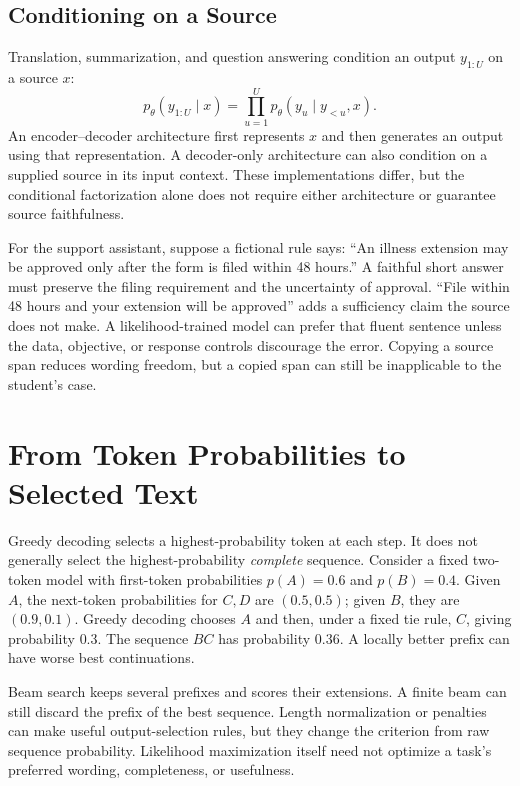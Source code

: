 \subsection{Conditioning on a Source}

Translation, summarization, and question answering condition an output $y_{1:U}$ on a source $x$:
\[
 p_\theta(y_{1:U}\mid x)=\prod_{u=1}^{U}
 p_\theta(y_u\mid y_{<u},x).
\]
An encoder--decoder architecture first represents $x$ and then generates an output using that representation. A decoder-only architecture can also condition on a supplied source in its input context. These implementations differ, but the conditional factorization alone does not require either architecture or guarantee source faithfulness.

For the support assistant, suppose a fictional rule says: ``An illness extension may be approved only after the form is filed within 48 hours.'' A faithful short answer must preserve the filing requirement and the uncertainty of approval. ``File within 48 hours and your extension will be approved'' adds a sufficiency claim the source does not make. A likelihood-trained model can prefer that fluent sentence unless the data, objective, or response controls discourage the error. Copying a source span reduces wording freedom, but a copied span can still be inapplicable to the student's case.

\section{From Token Probabilities to Selected Text}

Greedy decoding selects a highest-probability token at each step. It does not generally select the highest-probability \emph{complete} sequence. Consider a fixed two-token model with first-token probabilities $p(A)=0.6$ and $p(B)=0.4$. Given $A$, the next-token probabilities for $C,D$ are $(0.5,0.5)$; given $B$, they are $(0.9,0.1)$. Greedy decoding chooses $A$ and then, under a fixed tie rule, $C$, giving probability $0.3$. The sequence $BC$ has probability $0.36$. A locally better prefix can have worse best continuations.

Beam search keeps several prefixes and scores their extensions. A finite beam can still discard the prefix of the best sequence. Length normalization or penalties can make useful output-selection rules, but they change the criterion from raw sequence probability. Likelihood maximization itself need not optimize a task's preferred wording, completeness, or usefulness.

